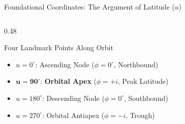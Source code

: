 \documentclass[aspectratio=169,10pt]{beamer}
\begin{document}
\begin{frame}{Foundational Coordinates: The Argument of Latitude (\texorpdfstring{$u$}{u})}
\begin{columns}[t]
\begin{column}{0.48\textwidth}
            \begin{block}{Four Landmark Points Along Orbit}
                \scriptsize
                \begin{itemize}\setlength{\itemsep}{1pt}
                    \item $u = 0^\circ$: Ascending Node ($\phi = 0^\circ$, Northbound)
                    \item $\mathbf{u = 90^\circ}$: \textbf{Orbital Apex} ($\phi = +i$, Peak Latitude)
                    \item $u = 180^\circ$: Descending Node ($\phi = 0^\circ$, Southbound)
                    \item $u = 270^\circ$: Orbital Antiapex ($\phi = -i$, Trough)
                \end{itemize}
            \end{block}
        \end{column}
    \end{columns}
\end{frame}
\end{document}
